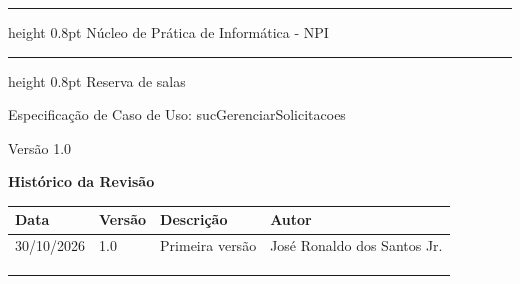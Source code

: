 \documentclass[12pt,a4paper]{article}
\newcommand{\ucnome}{sucGerenciarSolicitacoes}
\newcommand{\ucprojeto}{Reserva de salas}
\newcommand{\ucversao}{1.0}
\newcommand{\ucdata}{30/10/2026}
\newcommand{\ucautor}{José Ronaldo dos Santos Jr.}
\newcommand{\ucorgao}{Núcleo de Prática de Informática - NPI}
\newcommand{\uctitulo}{Especificação de Caso de Uso: \ucnome}
\begin{document}

\thispagestyle{empty}
\vspace*{-3.3cm}
{\bfseries
  \hrule height 0.8pt
  \vspace{10pt}
  \raggedleft \Large \ucorgao \par
  \vspace{10pt}
  \hrule height 0.8pt
  \vspace{36pt}
  \raggedleft \Large \ucprojeto \par
  \vspace{12pt}
  \raggedleft \Large \uctitulo \par
  \vspace{36pt}
  \raggedleft \large Versão \ucversao \par
}
\newpage


\begin{center}
  {\Large\bfseries Histórico da Revisão}
\end{center}

\vspace{\baselineskip}

{\small
\noindent
\begin{tabularx}{\textwidth}{|p{2.6cm}|p{1.6cm}|X|p{3.6cm}|}
  \hline
  \centering\textbf{Data} & \centering\textbf{Versão} & \centering\textbf{Descrição}
    & \centering\arraybackslash\textbf{Autor} \\
  \hline
  \ucdata & \ucversao & Primeira versão & \ucautor \\
  \hline
  & & & \\
  \hline
  & & & \\
  \hline
  & & & \\
  \hline
\end{tabularx}
\par}

\vspace{\baselineskip}

{\tableofcontents\par}
\thispagestyle{fancy}
\newpage
\end{document}
